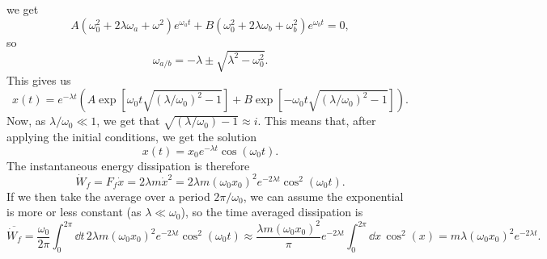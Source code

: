 \documentclass{article}
\begin{document}
        we get
        \begin{equation*}
            A(\omega_0^2 + 2 \lambda \omega_a + \omega^2)e^{\omega_a t} + B(\omega_0^2 + 2 \lambda \omega_b + \omega_b^2)e^{\omega_b t} = 0,
        \end{equation*}
        so
        \begin{equation*}
            \omega_{a/b} = -\lambda \pm \sqrt{\lambda^2 - \omega_0^2}.
        \end{equation*}
        This gives us
        \begin{equation*}
            x(t) = e^{-\lambda t} \left( A \exp \left[\omega_0 t \sqrt{(\lambda / \omega_0)^2 - 1} \right] + B \exp \left[- \omega_0 t \sqrt{(\lambda / \omega_0)^2 - 1} \right] \right).
        \end{equation*}
        Now, as $\lambda/\omega_0 \ll 1$, we get that $\sqrt{(\lambda / \omega_0) - 1} \approx i$. This means that, after applying the initial conditions, we get the solution
        \begin{equation*}
            x(t) = x_0 e^{-\lambda t} \cos(\omega_0 t).
        \end{equation*}
        The instantaneous energy dissipation is therefore 
        \begin{equation*}
            \dot W_f = F_f \dot x = 2 \lambda m \dot x^2 = 2 \lambda m (\omega_0x_0)^2 e^{-2\lambda t} \cos^2(\omega_0 t).
        \end{equation*}
        If we then take the average over a period $2 \pi / \omega_0$, we can assume the exponential is more or less constant (as $\lambda \ll \omega_0$), so the time averaged dissipation is 
        \begin{equation*}
            \overline{\dot W_f} = \frac{\omega_0}{2 \pi} \int_0^{2 \pi} \dd t \, 2 \lambda m (\omega_0x_0)^2 e^{-2\lambda t} \cos^2(\omega_0 t) \approx \frac{\lambda m (\omega_0x_0)^2}{\pi} e^{-2 \lambda t} \int_0^{2 \pi} \dd x \, \cos^2(x) =  m \lambda (\omega_0 x_0)^2 e^{-2\lambda t}.
        \end{equation*}
\end{document}

